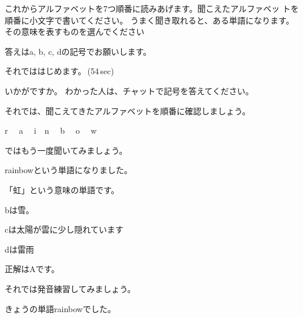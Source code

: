 \documentclass[12pt]{jlreq}
\begin{document}
これからアルファベットを7つ順番に読みあげます。聞こえたアルファベッ
トを順番に小文字で書いてください。
うまく聞き取れると、ある単語になります。
その意味を表すものを選んでください

答えはa, b, c, dの記号でお願いします。

それでははじめます。\faVolumeUp\,(54\,sec)

いかがですか。
わかった人は、チャットで記号を答えてください。

それでは、聞こえてきたアルファベットを順番に確認しましょう。{\large \ComputerMouse}

r\,\,
{\large \ComputerMouse}\,\,
a\,\,
{\large \ComputerMouse}\,\,
i
{\large \ComputerMouse}\,\,
n\,\,
{\large \ComputerMouse}\,\,
b\,\,
{\large \ComputerMouse}\,\,
o\,\,
{\large \ComputerMouse}\,\,
w\,\,

ではもう一度聞いてみましょう。

rainbowという単語になりました。

「虹」という意味の単語です。


bは雪。

cは太陽が雲に少し隠れています

dは雷雨


正解はAです。

それでは発音練習してみましょう。

きょうの単語rainbowでした。

{\large \ComputerMouse}\,\,
\end{document}
